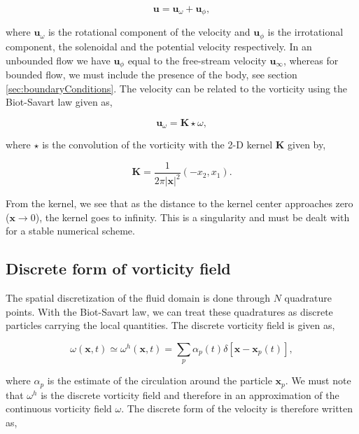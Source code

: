 	\begin{equation}
	\mathbf{u} = \mathbf{u}_{\omega} + \mathbf{u}_{\phi},
	\label{eq:helmholtz}
	\end{equation}

where $\mathbf{u}_{\omega}$ is the rotational component of the velocity and $\mathbf{u}_{\phi}$ is the irrotational component, the solenoidal and the potential velocity respectively. In an unbounded flow we have $\mathbf{u}_{\phi}$ equal to the free-stream velocity $\mathbf{u}_{\infty}$, whereas for bounded flow, we must include the presence of the body, see section \ref{sec:boundaryConditions}. The velocity can be related to the vorticity using the Biot-Savart law given as,

	\begin{equation}
	\mathbf{u}_{\omega} = \mathbf{K}\star\omega,
	\end{equation}
	
where $\star$ is the convolution of the vorticity with the 2-D kernel $\mathbf{K}$ given by,

	\begin{equation}
	\mathbf{K} = \frac{1}{2\pi\left|\mathbf{x}\right|^2}\left(-x_2,x_1\right).
	\label{eq:GreensKernel}
	\end{equation}
	
From the kernel, we see that as the distance to the kernel center approaches zero ($\mathbf{x} \rightarrow 0$), the kernel goes to infinity. This is a singularity and must be dealt with for a stable numerical scheme. 	
	
\subsection{Discrete form of vorticity field}
The spatial discretization of the fluid domain is done through $N$ quadrature points. With the Biot-Savart law, we can treat these quadratures as discrete particles carrying the local quantities. The discrete vorticity field is given as,

	\begin{equation}
	\omega\left(\mathbf{x},t\right) \simeq \omega^h\left(\mathbf{x},t\right) = \sum_{p}\alpha_p\left(t\right)\delta \left[\mathbf{x}-\mathbf{x}_p\left(t\right)\right],
	\end{equation}

where $\alpha_{p}$ is the estimate of the circulation around the particle $\mathbf{x}_p$. We must note that $\omega^h$ is the discrete vorticity field and therefore in an approximation of the continuous vorticity field $\omega$. The discrete form of the velocity is therefore written as,

